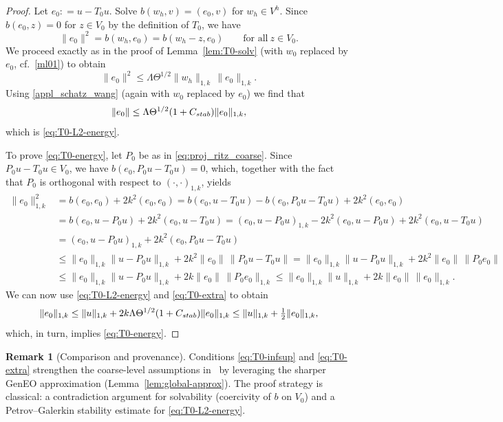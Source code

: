 \documentclass[preprint,3p,times]{elsarticle}
\newcommand{\assign}{\mathrel{\mathop:}=}
\newcommand{\Cstab}{C_{\textup{\textsf{stab}}}}
\theoremstyle{definition}
\newtheorem{remark}[theorem]{Remark}
\numberwithin{equation}{section}
\begin{document}
\begin{proof}
Let $e_0\assign u-T_0 u$.  Solve $b(w_h,v)=(e_0,v)$ for $w_h\in V^h$.
Since $b(e_0,z)=0$ for $z\in V_0$ by the definition of $T_0$, we have
\[
	\|e_0\|^2 = b(w_h,e_0) = b(w_h-z,e_0)\qquad\text{for all} \ z\in V_0.
\]
We proceed exactly as in the proof of Lemma~\ref{lem:T0-solv} (with $w_0$ replaced by $e_0$, cf.\ \eqref{ml01}) to obtain
\[
	\|e_0\|^2 \le \Lambda\Theta^{1/2}\|w_h\|_{1, k}^{\phantom{1}}\,\|e_0\|_{1, k}.
\]
Using \eqref{appl_schatz_wang} (again with $w_0$ replaced by $e_0$) we find that
\[
	\|e_0\| \le \Lambda\Theta^{1/2}(1+\Cstab)\|e_0\|_{1,k},
\]
which is \eqref{eq:T0-L2-energy}. 

To prove \eqref{eq:T0-energy}, let $P_0$ be as in \eqref{eq:proj_ritz_coarse}.
Since $P_0u-T_0u\in V_0$, we have $b(e_0,P_0u-T_0u)=0$, which, together with the fact that $P_0$ 
is orthogonal with respect to $(\cdot, \cdot)_{1, k}$, yields
\begin{align*}
	\|e_0\|_{1, k}^2 &= b(e_0,e_0) + 2k^2(e_0,e_0)
	= b(e_0,u-T_0u) - b(e_0,P_0u-T_0u) + 2k^2(e_0,e_0)
	\\[1ex]
	&= b(e_0,u-P_0u) + 2k^2(e_0,u-T_0u)
	= (e_0,u-P_0u)_{1,k} - 2k^2(e_0,u-P_0u) + 2k^2(e_0,u-T_0u)
	\\[1ex]
	&= (e_0,u-P_0u)_{1, k} + 2k^2(e_0,P_0u-T_0u)
	\\[1ex]
	&\le \|e_0\|_{1, k} \|u-P_0u\|_{1, k} + 2k^2\|e_0\|\,\|P_0u-T_0u\|
	= \|e_0\|_{1, k} \|u-P_0u\|_{1, k} + 2 k^2 \|e_0\|\,\|P_0e_0\|
	\\[1ex]
	&\le \|e_0\|_{1, k} \|u-P_0u\|_{1, k} + 2 k\|e_0\|\,\|P_0e_0\|_{1, k}
	\le \|e_0\|_{1, k} \|u\|_{1, k} + 2 k\|e_0\|\,\|e_0\|_{1, k}.
\end{align*}
We can now use \eqref{eq:T0-L2-energy} and \eqref{eq:T0-extra} to obtain
\[
	\|e_0\|_{1, k} \le \|u\|_{1, k} + 2k\Lambda\Theta^{1/2}(1+\Cstab)\|e_0\|_{1, k}
	\le \|u\|_{1, k} + \tfrac12\|e_0\|_{1, k},
\]
which, in turn, implies \eqref{eq:T0-energy}.
\end{proof}

\begin{remark}[Comparison and provenance]
Conditions \eqref{eq:T0-infsup} and \eqref{eq:T0-extra} strengthen the coarse-level assumptions in~\cite{Bootland:2022:OSM}
by leveraging the sharper GenEO approximation (Lemma~\ref{lem:global-approx}). The proof strategy is classical:
a contradiction argument for solvability (coercivity of $b$ on $V_0$) and a Petrov--Galerkin stability estimate for \eqref{eq:T0-L2-energy}.
\end{remark}
\end{document}
